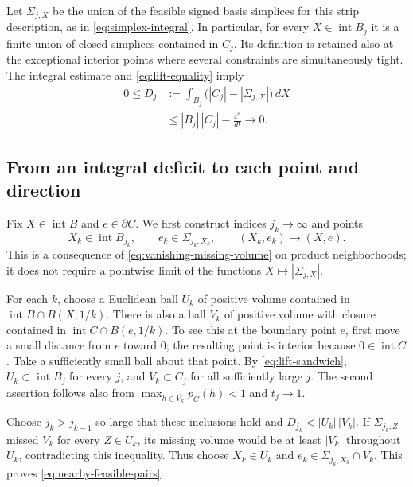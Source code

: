 Let $\Sigma_{j,X}$ be the union of the feasible signed basis
simplices for this strip description, as in
\eqref{eq:simplex-integral}. In particular, for every
$X\in\operatorname{int}B_j$ it is a finite union of closed simplices
contained in $C_j$. Its definition is retained also at the exceptional
interior points where several constraints are simultaneously tight.
The integral estimate and \eqref{eq:lift-equality} imply
\begin{equation}\label{eq:vanishing-missing-volume}
 \begin{split}
 0\le D_j
 &:=\int_{B_j}\bigl(|C_j|-|\Sigma_{j,X}|\bigr)\,dX\\
 &\le |B_j|\,|C_j|-\frac{4^d}{d!}
 \longrightarrow0.
 \end{split}
\end{equation}

\subsection{From an integral deficit to each point and direction}

Fix $X\in\operatorname{int}B$ and $e\in\partial C$. We first
construct indices $j_k\to\infty$ and points
\begin{equation}\label{eq:nearby-feasible-pairs}
 X_k\in\operatorname{int}B_{j_k},\qquad
 e_k\in\Sigma_{j_k,X_k},\qquad
 (X_k,e_k)\longrightarrow(X,e).
\end{equation}
This is a consequence of \eqref{eq:vanishing-missing-volume} on
product neighborhoods; it does not require a pointwise limit of the
functions $X\mapsto|\Sigma_{j,X}|$.

For each $k$, choose a Euclidean ball $U_k$ of positive volume
contained in $\operatorname{int}B\cap B(X,1/k)$. There is also a ball
$V_k$ of positive volume with closure contained in
$\operatorname{int}C\cap B(e,1/k)$. To see this at the boundary point
$e$, first move a small distance from $e$ toward $0$; the resulting
point is interior because $0\in\operatorname{int}C$. Take a sufficiently
small ball about that point. By \eqref{eq:lift-sandwich},
$U_k\subset\operatorname{int}B_j$ for every $j$, and
$V_k\subset C_j$ for all sufficiently large $j$. The second assertion
follows also from $\max_{h\in\overline{V_k}}p_C(h)<1$ and $t_j\to1$.

Choose $j_k>j_{k-1}$ so large that these inclusions hold and
$D_{j_k}<|U_k|\,|V_k|$. If $\Sigma_{j_k,Z}$ missed $V_k$ for every
$Z\in U_k$, its missing volume would be at least $|V_k|$ throughout
$U_k$, contradicting this inequality. Thus choose
$X_k\in U_k$ and $e_k\in\Sigma_{j_k,X_k}\cap V_k$.
This proves \eqref{eq:nearby-feasible-pairs}.

